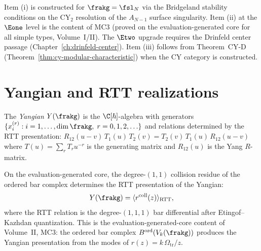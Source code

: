 \begin{remark}
\label{rem:cy-c-proof-inputs}
Item (i) is constructed for $\frakg = \fsl_N$ via the Bridgeland
stability conditions on the CY$_2$ resolution of the $A_{N-1}$
surface singularity. Item (ii) at the $\Eone$ level is the content
of MC3 (proved on the evaluation-generated core for all simple types, Volume~I/II). The $\Etwo$
upgrade requires the Drinfeld center passage
(Chapter~\ref{ch:drinfeld-center}). Item (iii) follows from
Theorem~CY-D (Theorem~\ref{thm:cy-modular-characteristic}) when
the CY category is constructed.
\end{remark}


\section{Yangian and RTT realizations}
\label{sec:yangian-rtt}

\begin{definition}[Yangian]
\label{def:yangian}
The \emph{Yangian} $Y(\frakg)$ is the $\C[\hbar]$-algebra with
generators $\{x^{(r)}_i : i = 1, \ldots, \dim \frakg, \;
r = 0, 1, 2, \ldots\}$ and relations determined by the RTT
presentation: $R_{12}(u-v) \, T_1(u) \, T_2(v)
= T_2(v) \, T_1(u) \, R_{12}(u-v)$ where $T(u) = \sum_r T_r u^{-r}$
is the generating matrix and $R_{12}(u)$ is the Yang $R$-matrix.
\end{definition}

\begin{proposition}
\label{prop:yangian-collision}
On the evaluation-generated core, the degree-$(1,1)$ collision residue
of the ordered bar complex determines the RTT presentation of the
Yangian:
\[
 Y(\frakg) = \langle r^{\mathrm{coll}}(z) \rangle_{\mathrm{RTT}},
\]
where the RTT relation is the degree-$(1,1,1)$ bar differential after
Etingof--Kazhdan quantization. This is the evaluation-generated-core
content of Volume~II, MC3: the ordered bar complex
$B^{\mathrm{ord}}(V_k(\frakg))$ produces the Yangian presentation from
the modes of $r(z)=k\,\Omega_{\mathrm{tr}}/z$.
\end{proposition}

